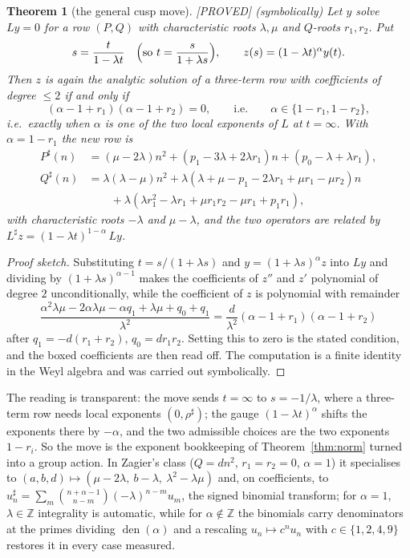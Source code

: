 \documentclass[11pt,reqno]{amsart}
\theoremstyle{plain}
\newtheorem{theorem}{Theorem}[section]
\theoremstyle{definition}
\theoremstyle{remark}
\theoremstyle{plain}
\newcommand{\Z}{\mathbb{Z}}
\newcommand{\Proved}{\textup{\textsf{[PROVED]}}}
\begin{document}
\begin{theorem}[the general cusp move]\label{thm:move}
\Proved{} \textup{(}symbolically\textup{)} Let $y$ solve $Ly=0$ for a row
$(P,Q)$ with characteristic roots $\lambda,\mu$ and $Q$-roots $r_1,r_2$. Put
\[
s=\frac{t}{1-\lambda t}\quad\Bigl(\text{so }t=\frac{s}{1+\lambda s}\Bigr),
\qquad z(s)=(1-\lambda t)^{\alpha}y(t).
\]
Then $z$ is again the analytic solution of a three-term row with coefficients of
degree $\le2$ \emph{if and only if}
\[
(\alpha-1+r_1)(\alpha-1+r_2)=0,\qquad\text{i.e.}\qquad \alpha\in\{1-r_1,1-r_2\},
\]
i.e.\ exactly when $\alpha$ is one of the two local exponents of $L$ at
$t=\infty$. With $\alpha=1-r_1$ the new row is
\[
\begin{aligned}
P^{\sharp}(n)&=(\mu-2\lambda)n^2+(p_1-3\lambda+2\lambda r_1)n
   +(p_0-\lambda+\lambda r_1),\\
Q^{\sharp}(n)&=\lambda(\lambda-\mu)n^2
   +\lambda(\lambda+\mu-p_1-2\lambda r_1+\mu r_1-\mu r_2)n\\
&\qquad+\lambda(\lambda r_1^2-\lambda r_1+\mu r_1r_2-\mu r_1+p_1r_1),
\end{aligned}
\]
with characteristic roots $-\lambda$ and $\mu-\lambda$, and the two operators are
related by $L^{\sharp}z=(1-\lambda t)^{1-\alpha}\,Ly$.
\end{theorem}

\begin{proof}[Proof sketch]
Substituting $t=s/(1+\lambda s)$ and $y=(1+\lambda s)^{\alpha}z$ into $Ly$ and
dividing by $(1+\lambda s)^{\alpha-1}$ makes the coefficients of $z''$ and $z'$
polynomial of degree $2$ unconditionally, while the coefficient of $z$ is
polynomial with remainder
\[
\frac{\alpha^2\lambda\mu-2\alpha\lambda\mu-\alpha q_1+\lambda\mu+q_0+q_1}{\lambda^2}
=\frac{d}{\lambda^2}(\alpha-1+r_1)(\alpha-1+r_2)
\]
after $q_1=-d(r_1+r_2)$, $q_0=dr_1r_2$. Setting this to zero is the stated
condition, and the boxed coefficients are then read off. The computation is a
finite identity in the Weyl algebra and was carried out symbolically.
\end{proof}

The reading is transparent: the move sends $t=\infty$ to $s=-1/\lambda$, where a
three-term row needs local exponents $(0,\rho^\sharp)$; the gauge
$(1-\lambda t)^{\alpha}$ shifts the exponents there by $-\alpha$, and the two
admissible choices are the two exponents $1-r_i$. So the move is the exponent
bookkeeping of Theorem~\ref{thm:norm} turned into a group action. In Zagier's
class ($Q=dn^2$, $r_1=r_2=0$, $\alpha=1$) it specialises to
$(a,b,d)\mapsto(\mu-2\lambda,\ b-\lambda,\ \lambda^2-\lambda\mu)$ and, on
coefficients, to
$u^\sharp_n=\sum_m\binom{n+\alpha-1}{n-m}(-\lambda)^{n-m}u_m$, the signed
binomial transform; for $\alpha=1$, $\lambda\in\Z$ integrality is automatic,
while for $\alpha\notin\Z$ the binomials carry denominators at the primes
dividing $\operatorname{den}(\alpha)$ and a rescaling $u_n\mapsto c^nu_n$ with
$c\in\{1,2,4,9\}$ restores it in every case measured.
\end{document}
